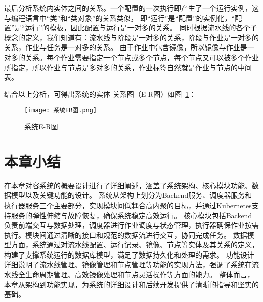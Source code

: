 最后分析系统内实体之间的关系。一个配置的一次执行即产生了一个运行实例，这与编程语言中“类”和“类对象”的关系类似，
即“运行”是“配置”的实例化，“配置”是“运行”的模板，因此配置与运行是一对多的关系。
同时根据流水线的各个子概念的定义，我们知道有：流水线与阶段是一对多的关系，阶段与作业是一对多的关系，作业与任务是一对多的关系。
由于作业中包含镜像，所以镜像与作业是一对多的关系。每个作业需要指定一个节点或多个节点，每个节点又可以被多个作业所指定，所以作业与节点是多对多的关系，作业标签自然就是作业与节点的中间表。

结合以上分析，可得出系统的实体-关系图（E-R图）如图~\ref{fig:系统E-R图}：

\begin{figure}[h]
  \centering
  \texttt{[image: 系统ER图.png]}
  \caption{系统E-R图}
  \label{fig:系统E-R图}
\end{figure}

\section{本章小结}

在本章对容系统的概要设计进行了详细阐述，涵盖了系统架构、核心模块功能、数据模型以及关键功能的设计。
系统从架构上划分为Backend服务、调度器服务和执行器服务三个主要部分，实现模块间低耦合高内聚的目标，并通过Kubernetes支持服务的弹性伸缩与故障恢复，确保系统稳定高效运行。
核心模块包括Backend负责前端交互与数据处理，调度器进行作业调度与状态管理，执行器确保作业按需执行。模块间通过清晰的接口和规范的数据流进行交互，协同完成任务。
数据模型方面，系统通过对流水线配置、运行记录、镜像、节点等实体及其关系的定义，构建了支撑系统运行的数据库模型，满足了数据持久化和处理的需求。
功能设计详细说明了流水线管理、镜像管理和节点管理等功能的实现方法，强调了系统在流水线全生命周期管理、高效镜像处理和节点灵活操作等方面的能力。
整体而言，本章从架构到功能实现，为系统的详细设计和后续开发提供了清晰的指导和坚实的基础。